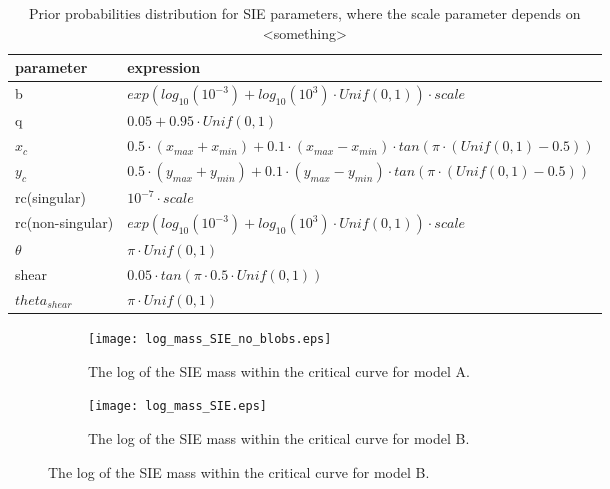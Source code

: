 \documentclass[useAMS,usenatbib]{mn2e}
\begin{document}
\begin{table}
\centering
\begin{tabular}{ l l}
parameter    &  expression        \\  
\hline 
b            &  $exp\left(  log_{10}(10^{-3})+  log_{10}(10^{3})\cdot Unif(0,1) \right)\cdot scale  $ \\
q            &  $0.05 + 0.95\cdot Unif(0,1) $ \\
$x_c$       &  $0.5\cdot (x_{max} + x_{min}) +   0.1 \cdot(x_{max} - x_{min}) \cdot tan(\pi\cdot ( Unif(0,1) - 0.5)  )$ \\
$		y_c$  &  $0.5\cdot (y_{max} + y_{min}) + 0.1\cdot (y_{max} - y_{min}) \cdot tan(\pi\cdot (Unif(0,1)  - 0.5)  ) $\\
rc(singular)   & $10^{-7}\cdot scale$ \\
rc(non-singular)   & $  exp\left(log_{10}(10^{-3})+  log_{10}(10^{3})\cdot Unif(0,1)\right) \cdot scale   $\\
$\theta$   & $\pi \cdot Unif(0,1)$\\
shear      & $0.05 \cdot tan(\pi \cdot 0.5 \cdot Unif(0,1)) $\\
$theta_{shear}$  & $ \pi\cdot Unif(0,1)$ \\
\end{tabular}
\parbox{0.75\linewidth}{\caption{Prior probabilities distribution for SIE parameters, where the scale parameter depends on <something> \label{table:1} }}

\end{table}


 \begin{figure}
\begin{subfigure}{.45\textwidth}
  \centering
  \texttt{[image: log\_mass\_SIE\_no\_blobs.eps]}
\parbox{0.8\linewidth}{\caption{The log of the SIE mass within the critical curve  for model A.  \label{fig:sub1} }}
\end{subfigure}%
\begin{subfigure}{.45\textwidth}
  \centering
  \texttt{[image: log\_mass\_SIE.eps]}
   \parbox{0.8\linewidth}{\caption{The log of the SIE mass within the critical curve for model B.   \label{fig:sub2}}}
\end{subfigure}
   \end{figure}
\end{document}
